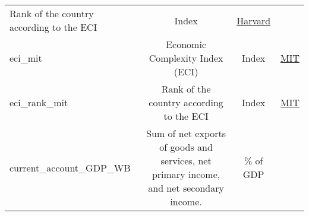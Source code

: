 \documentclass[]{article}
\begin{document}
\begin{longtable}[]{@{}lccc@{}}
\begin{minipage}[t]{0.36\columnwidth}
Rank of the country according to the ECI\strut
\end{minipage} & \begin{minipage}[t]{0.24\columnwidth}\centering\strut
Index\strut
\end{minipage} & \begin{minipage}[t]{0.15\columnwidth}\centering\strut
\href{http://atlas.cid.harvard.edu/downloads}{Harvard}\strut
\end{minipage}\tabularnewline
\begin{minipage}[t]{0.14\columnwidth}\raggedright\strut
eci\_mit\strut
\end{minipage} & \begin{minipage}[t]{0.36\columnwidth}\centering\strut
Economic Complexity Index (ECI)\strut
\end{minipage} & \begin{minipage}[t]{0.24\columnwidth}\centering\strut
Index\strut
\end{minipage} & \begin{minipage}[t]{0.15\columnwidth}\centering\strut
\href{https://atlas.media.mit.edu/en/resources/data/}{MIT}\strut
\end{minipage}\tabularnewline
\begin{minipage}[t]{0.14\columnwidth}\raggedright\strut
eci\_rank\_mit\strut
\end{minipage} & \begin{minipage}[t]{0.36\columnwidth}\centering\strut
Rank of the country according to the ECI\strut
\end{minipage} & \begin{minipage}[t]{0.24\columnwidth}\centering\strut
Index\strut
\end{minipage} & \begin{minipage}[t]{0.15\columnwidth}\centering\strut
\href{https://atlas.media.mit.edu/en/resources/data/}{MIT}\strut
\end{minipage}\tabularnewline
\begin{minipage}[t]{0.14\columnwidth}\raggedright\strut
current\_account\_GDP\_WB\strut
\end{minipage} & \begin{minipage}[t]{0.36\columnwidth}\centering\strut
Sum of net exports of goods and services, net primary income, and net
secondary income.\strut
\end{minipage} & \begin{minipage}[t]{0.24\columnwidth}\centering\strut
\% of GDP\strut
\end{minipage} & \begin{minipage}[t]{0.15\columnwidth}\centering\strut

\end{minipage}
\end{longtable}
\end{document}
